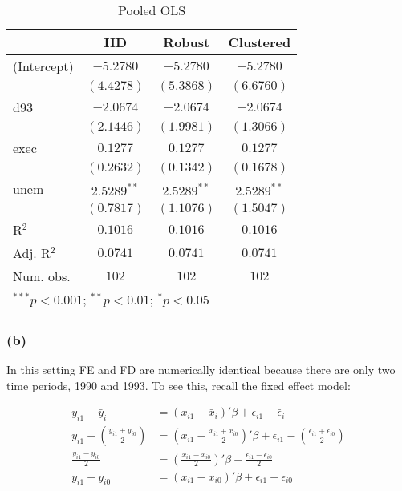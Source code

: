 \documentclass[
]{article}
\begin{document}
\begin{table}
\caption{Pooled OLS}
\begin{center}
\begin{tabular}{l c c c}
\hline
 & IID & Robust & Clustered \\
\hline
(Intercept) & $-5.2780$     & $-5.2780$     & $-5.2780$     \\
            & $(4.4278)$    & $(5.3868)$    & $(6.6760)$    \\
d93         & $-2.0674$     & $-2.0674$     & $-2.0674$     \\
            & $(2.1446)$    & $(1.9981)$    & $(1.3066)$    \\
exec        & $0.1277$      & $0.1277$      & $0.1277$      \\
            & $(0.2632)$    & $(0.1342)$    & $(0.1678)$    \\
unem        & $2.5289^{**}$ & $2.5289^{**}$ & $2.5289^{**}$ \\
            & $(0.7817)$    & $(1.1076)$    & $(1.5047)$    \\
\hline
R$^2$       & $0.1016$      & $0.1016$      & $0.1016$      \\
Adj. R$^2$  & $0.0741$      & $0.0741$      & $0.0741$      \\
Num. obs.   & $102$         & $102$         & $102$         \\
\hline
\multicolumn{4}{l}{\scriptsize{$^{***}p<0.001$; $^{**}p<0.01$; $^{*}p<0.05$}}
\end{tabular}
\label{table:coefficients}
\end{center}
\end{table}

\hypertarget{b}{%
\subsubsection{(b)}\label{b}}

In this setting FE and FD are numerically identical because there are
only two time periods, 1990 and 1993. To see this, recall the fixed
effect model:

\begin{align*}
  y_{i1} - \bar{y}_i &= (x_{i1} - \bar{x}_i)' \beta + \epsilon_{i1} - \bar{\epsilon}_i \\
  y_{i1} - \left( \frac{y_{i1}+y_{i0}}{2} \right) &= \left( x_{i1} - \frac{x_{i1}+x_{i0}}{2} \right)' \beta + \epsilon_{i1} - \left( \frac{\epsilon_{i1}+\epsilon_{i0}}{2} \right) \\
  \frac{y_{i1} - y_{i0}}{2} &= \left( \frac{x_{i1} - x_{i0}}{2} \right)' \beta + \frac{\epsilon_{i1} - \epsilon_{i0}}{2} \\
  y_{i1} - y_{i0} &= (x_{i1} - x_{i0})' \beta + \epsilon_{i1} - \epsilon_{i0}
\end{align*}
\end{document}
